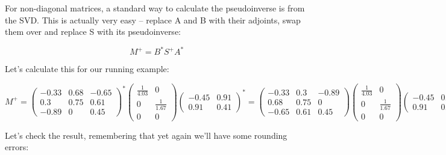 \documentclass[oneside,english]{amsbook}
\numberwithin{section}{chapter}
\theoremstyle{plain}
\theoremstyle{definition}
\begin{document}
For non-diagonal matrices, a standard way to calculate the pseudoinverse
is from the SVD. This is actually very easy -- replace A and B with
their adjoints, swap them over and replace S with its pseudoinverse:

\[M^{+} = B^{*}S^{+}A^{*}\]

Let's calculate this for our running example:

\[{M^{+} = \begin{pmatrix}
		- 0.33 & 0.68 & - 0.65 \\
		0.3 & 0.75 & 0.61 \\
		- 0.89 & 0 & 0.45
	\end{pmatrix}^{*}\begin{pmatrix}
		\frac{1}{4.03} & 0 \\
		0 & \frac{1}{1.67} \\
		0 & 0
	\end{pmatrix}\begin{pmatrix}
		- 0.45 & 0.91 \\
		0.91 & 0.41
	\end{pmatrix}^{*}
}{= \begin{pmatrix}
		- 0.33 & 0.3 & - 0.89 \\
		0.68 & 0.75 & 0 \\
		- 0.65 & 0.61 & 0.45
	\end{pmatrix}\begin{pmatrix}
		\frac{1}{4.03} & 0 \\
		0 & \frac{1}{1.67} \\
		0 & 0
	\end{pmatrix}\begin{pmatrix}
		- 0.45 & 0.91 \\
		0.91 & 0.41
	\end{pmatrix}
}{= \begin{pmatrix}
		0.2 & 0 \\
		0.33 & 0.33 \\
		0.4 & 0
\end{pmatrix}}\]

Let's check the result, remembering that yet again we'll have some
rounding errors:
\end{document}
